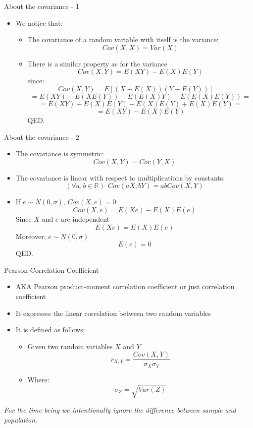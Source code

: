 \documentclass{beamer}
\begin{document}
\begin{frame}
{\centerline{About the covariance - 1}}

\begin{itemize}
\item We notice that:
\begin{itemize}
\item The covariance of a random variable with itself is the variance:
$$Cov(X,X) = Var(X)$$
\item There is a similar property as for the variance
$$Cov(X,Y) = E(XY) - E(X)E(Y)$$
since:
$$Cov(X,Y) = E[ (X - E(X))(Y - E(Y))] = $$
$$ = E(XY) - E(XE(Y)) - E(E(X)Y) + E(E(X)E(Y)) =$$
$$ = E(XY) - E(X)E(Y) - E(X)E(Y) + E(X)E(Y) = $$
$$ = E(XY) - E(X)E(Y)$$
QED.


\end{itemize}


\end{itemize}

\end{frame}


\begin{frame}
{\centerline{About the covariance - 2}} \label{P:Covariance2}

\begin{itemize}
\item The covariance is symmetric:
 $$Cov(X,Y) = Cov(Y,X)$$
\item The covariance is linear with respect to multiplications by constants:
 $$(\forall a, b \in \mathbb{R}) ~~ Cov(aX,bY) = abCov(X,Y)$$

\item If $e \sim N(0,\sigma)$, $Cov(X,e) = 0$ \\
$$Cov(X,e) =  E(Xe) - E(X)E(e)$$
Since  $X$ and $e$ are independent
$$ E(Xe) = E(X)E(e)$$
Moreover,  $e \sim N(0,\sigma)$
$$E(e) = 0$$
QED.
\end{itemize}


\end{frame}


\begin{frame}
{\centerline{Pearson Correlation Coefficient}} \label{P:Pearson}

\begin{itemize}
\item AKA Pearson product-moment correlation coefficient or just correlation coefficient
\item It expresses the linear correlation between two random variables
\item It is defined as follows:
\begin{itemize}
\item Given two random variables $X$ and $Y$
$$r_{X,Y} = \frac{Cov(X,Y)}{\sigma_X\sigma_Y}$$
\item Where:
$$\sigma_Z = \sqrt{Var(Z)}$$
\end{itemize}
\end{itemize}

\vspace*{0.5cm}

\textit{\small For the time being we intentionally ignore the difference between sample and population.}

\end{frame}
\end{document}
